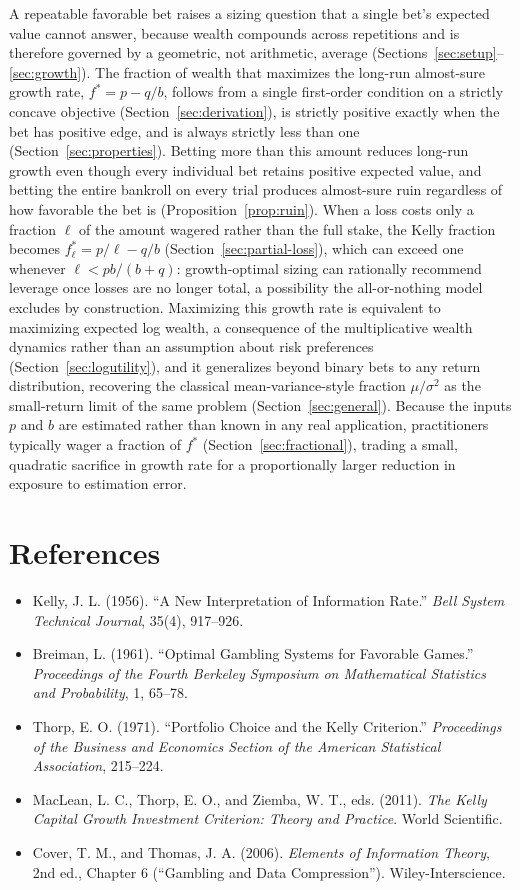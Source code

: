 \documentclass[11pt]{article}
\theoremstyle{remark}
\theoremstyle{definition}
\begin{document}
A repeatable favorable bet raises a sizing question that a single bet's expected value cannot answer, because wealth compounds across repetitions and is therefore governed by a geometric, not arithmetic, average (Sections~\ref{sec:setup}--\ref{sec:growth}). The fraction of wealth that maximizes the long-run almost-sure growth rate, $f^{*}=p-q/b$, follows from a single first-order condition on a strictly concave objective (Section~\ref{sec:derivation}), is strictly positive exactly when the bet has positive edge, and is always strictly less than one (Section~\ref{sec:properties}). Betting more than this amount reduces long-run growth even though every individual bet retains positive expected value, and betting the entire bankroll on every trial produces almost-sure ruin regardless of how favorable the bet is (Proposition~\ref{prop:ruin}). When a loss costs only a fraction $\ell$ of the amount wagered rather than the full stake, the Kelly fraction becomes $f_\ell^{*}=p/\ell-q/b$ (Section~\ref{sec:partial-loss}), which can exceed one whenever $\ell<pb/(b+q)$: growth-optimal sizing can rationally recommend leverage once losses are no longer total, a possibility the all-or-nothing model excludes by construction. Maximizing this growth rate is equivalent to maximizing expected log wealth, a consequence of the multiplicative wealth dynamics rather than an assumption about risk preferences (Section~\ref{sec:logutility}), and it generalizes beyond binary bets to any return distribution, recovering the classical mean-variance-style fraction $\mu/\sigma^2$ as the small-return limit of the same problem (Section~\ref{sec:general}). Because the inputs $p$ and $b$ are estimated rather than known in any real application, practitioners typically wager a fraction of $f^{*}$ (Section~\ref{sec:fractional}), trading a small, quadratic sacrifice in growth rate for a proportionally larger reduction in exposure to estimation error.

\section*{References}
\begin{itemize}
\item Kelly, J. L. (1956). ``A New Interpretation of Information Rate.'' \textit{Bell System Technical Journal}, 35(4), 917--926.
\item Breiman, L. (1961). ``Optimal Gambling Systems for Favorable Games.'' \textit{Proceedings of the Fourth Berkeley Symposium on Mathematical Statistics and Probability}, 1, 65--78.
\item Thorp, E. O. (1971). ``Portfolio Choice and the Kelly Criterion.'' \textit{Proceedings of the Business and Economics Section of the American Statistical Association}, 215--224.
\item MacLean, L. C., Thorp, E. O., and Ziemba, W. T., eds. (2011). \textit{The Kelly Capital Growth Investment Criterion: Theory and Practice}. World Scientific.
\item Cover, T. M., and Thomas, J. A. (2006). \textit{Elements of Information Theory}, 2nd ed., Chapter 6 (``Gambling and Data Compression''). Wiley-Interscience.
\end{itemize}
\end{document}
